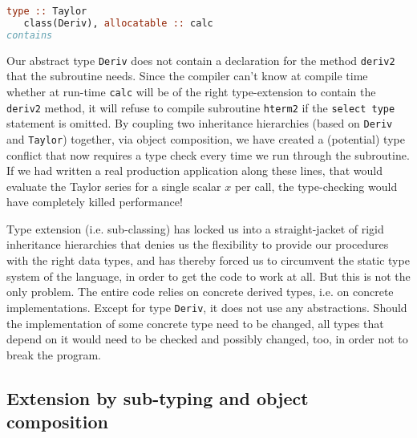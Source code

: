 \documentclass[11pt,oneside]{article}
\begin{document}
\begin{lstlisting}[language=Fortran]
type :: Taylor
   class(Deriv), allocatable :: calc
contains
\end{lstlisting}
Our abstract type \texttt{Deriv} does not contain a declaration for
the method \texttt{deriv2} that the subroutine needs. Since the
compiler can't know at compile time whether at run-time \texttt{calc}
will be of the right type-extension to contain the \texttt{deriv2}
method, it will refuse to compile subroutine \texttt{hterm2} if the
\texttt{select type} statement is omitted. By coupling two inheritance
hierarchies (based on \texttt{Deriv} and \texttt{Taylor}) together, via
object composition, we have created a (potential) type conflict that
now requires a type check every time we run through the subroutine. If
we had written a real production application along these lines, that
would evaluate the Taylor series for a single scalar $x$ per call, the
type-checking would have completely killed performance!

Type extension (i.e. sub-classing) has locked us into a
straight-jacket of rigid inheritance hierarchies that denies us the
flexibility to provide our procedures with the right data types, and
has thereby forced us to circumvent the static type system of the
language, in order to get the code to work at all. But this is not the
only problem. The entire code relies on concrete derived types,
i.e. on concrete implementations. Except for type \texttt{Deriv}, it
does not use any abstractions. Should the implementation of some
concrete type need to be changed, all types that depend on it would
need to be checked and possibly changed, too, in order not to break
the program.

\subsection{Extension by sub-typing and object composition}
\end{document}
